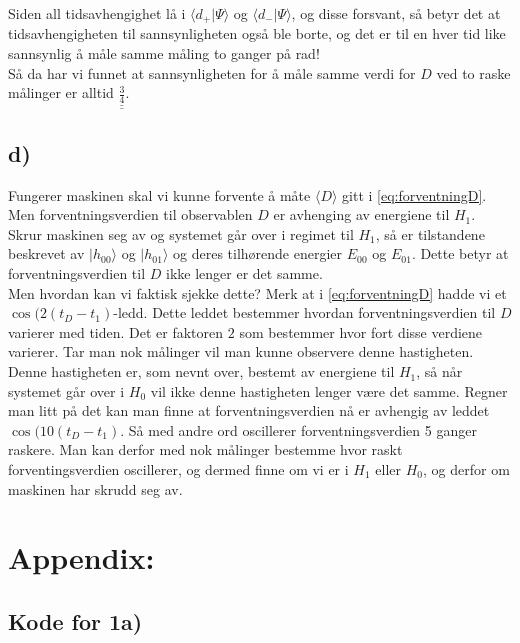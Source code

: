 \documentclass[a4paper,norsk, 10pt]{article}
\numberwithin{equation}{section}
\begin{document}
Siden all tidsavhengighet lå i $\langle d_+|\Psi\rangle$ og $\langle d_-|\Psi\rangle$, og disse forsvant, så betyr det at tidsavhengigheten til sannsynligheten også ble borte, og det er til en hver tid like sannsynlig å måle samme måling to ganger på rad!\\


Så da har vi funnet at sannsynligheten for å måle samme verdi for $D$ ved to raske målinger er alltid $\underline{\underline{\frac{3}{4}}}$.

\subsection*{d)}

Fungerer maskinen skal vi kunne forvente å måte $\langle D\rangle$ gitt i \eqref{eq:forventningD}. Men forventningsverdien til observablen $D$  er avhenging av energiene til $H_1$. Skrur maskinen seg av og systemet går over i regimet til $H_1$, så er tilstandene beskrevet av $|h_{00}\rangle$ og $|h_{01}\rangle$ og deres tilhørende energier $E_{00}$ og $E_{01}$. Dette betyr at forventningsverdien til $D$ ikke lenger er det samme.\\

Men hvordan kan vi faktisk sjekke dette? Merk at i \eqref{eq:forventningD} hadde vi et $\cos(2(t_D - t_1)$-ledd. Dette leddet bestemmer hvordan forventningsverdien til $D$ varierer med tiden. Det er faktoren $2$ som bestemmer hvor fort disse verdiene varierer. Tar man nok målinger vil man kunne observere denne hastigheten. Denne hastigheten er, som nevnt over, bestemt av energiene til $H_1$, så når systemet går over i $H_0$ vil ikke denne hastigheten lenger være det samme. Regner man litt på det kan man finne at forventningsverdien nå er avhengig av leddet $\cos(10(t_D - t_1)$. Så med andre ord oscillerer forventningsverdien 5 ganger raskere. Man kan derfor med nok målinger bestemme hvor raskt forventingsverdien oscillerer, og dermed finne om vi er i $H_1$ eller $H_0$, og derfor om maskinen har skrudd seg av.

\newpage

\section{Appendix:}
\subsection*{Kode for 1a)}

\label{lst:solver}
\end{document}
